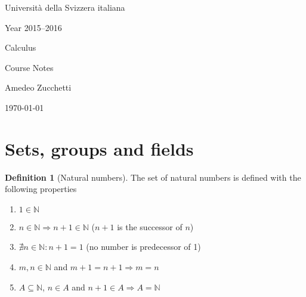\documentclass{article}
\newcommand{\Ar}{\Rightarrow}
\newenvironment{enumrom}{\begin{enumerate}[label=(\roman*)]}{\end{enumerate}}
\theoremstyle{definition}
\newtheorem{definition}{Definition}[section]
\theoremstyle{definition}
\theoremstyle{plain}
\theoremstyle{plain}
\theoremstyle{plain}
\theoremstyle{plain}
\theoremstyle{definition}
\theoremstyle{remark}
\theoremstyle{remark}
\theoremstyle{remark}
\theoremstyle{remark}
\newcommand{\N}{\mathbb{N}}
\newcommand{\TITLE}{Calculus}
\newcommand{\SUBTITLE}{Course Notes}
\newcommand{\INSTITUTION}{Universit\`a della Svizzera italiana}
\newcommand{\PERIOD}{Year 2015--2016}
\newcommand{\AUTHOR}{Amedeo Zucchetti}
\begin{document}

\thispagestyle{empty}

\begin{center}
  \vspace*{4cm}  {\Large \INSTITUTION \par}
  \vspace{0.2cm} {\large \PERIOD      \par}
  \vspace{1cm}   {\Huge  \TITLE       \par}
  \vspace{0.5cm} {\LARGE \SUBTITLE    \par}
  \vspace{1cm}   {\Large \AUTHOR      \par}
  \vspace{0.2cm} {\large \today       \par}
\end{center}
\pagebreak

\setcounter{tocdepth}{2}
\tableofcontents
\pagebreak


\section{Sets, groups and fields}


\begin{definition}[Natural numbers]
  The set of natural numbers is defined with the following properties
  \begin{enumrom}
  \item $1 \in \N$
  \item $n \in \N \Ar n+1 \in \N$ ($n+1$ is the successor of $n$)
  \item $\nexists n \in \N : n+1 = 1$ (no number is predecessor of 1)
  \item $m, n \in \N$ and $m+1 = n+1 \Ar m = n$
  \item $A \subseteq \N$, $n \in A$ and $n+1 \in A \Ar A = \N$
  \end{enumrom}
\end{definition}
\end{document}

